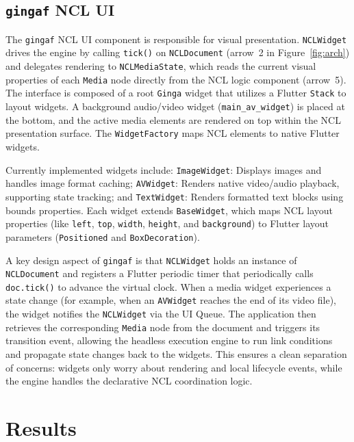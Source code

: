 \documentclass[sigconf]{acmart}
\newcommand{\projectname}{\texttt{gingaf}}
\begin{document}
\subsection{\projectname{} NCL UI}
\label{sec:nclui}

The \projectname{} NCL UI component is responsible for visual presentation. \texttt{NCLWidget} drives the engine by calling \texttt{tick()} on \texttt{NCLDocument} (arrow~2 in Figure~\ref{fig:arch}) and delegates rendering to \texttt{NCLMediaState}, which reads the current visual properties of each \texttt{Media} node directly from the NCL logic component (arrow~5). The interface is composed of a root \texttt{Ginga} widget that utilizes a Flutter \texttt{Stack} to layout widgets. A background audio/video widget (\texttt{main\_av\_widget}) is placed at the bottom, and the active media elements are rendered on top within the NCL presentation surface. The \texttt{WidgetFactory} maps NCL elements to native Flutter widgets. 

Currently implemented widgets include: \texttt{ImageWidget}: Displays images and handles image format caching; \texttt{AVWidget}: Renders native video/audio playback, supporting state tracking; and \texttt{TextWidget}: Renders formatted text blocks using bounds properties. Each widget extends \texttt{BaseWidget}, which maps NCL layout properties (like \texttt{left}, \texttt{top}, \texttt{width}, \texttt{height}, and \texttt{background}) to Flutter layout parameters (\texttt{Positioned} and \texttt{BoxDecoration}).

A key design aspect of \projectname{} is that \texttt{NCLWidget} holds an instance of \texttt{NCLDocument} and registers a Flutter periodic timer that periodically calls \texttt{doc.tick()} to advance the virtual clock. When a media widget experiences a state change (for example, when an \texttt{AVWidget} reaches the end of its video file), the widget notifies the \texttt{NCLWidget} via the UI Queue. The application then retrieves the corresponding \texttt{Media} node from the document and triggers its transition event, allowing the headless execution engine to run link conditions and propagate state changes back to the widgets. This ensures a clean separation of concerns: widgets only worry about rendering and local lifecycle events, while the engine handles the declarative NCL coordination logic.

\section{Results}
\end{document}
